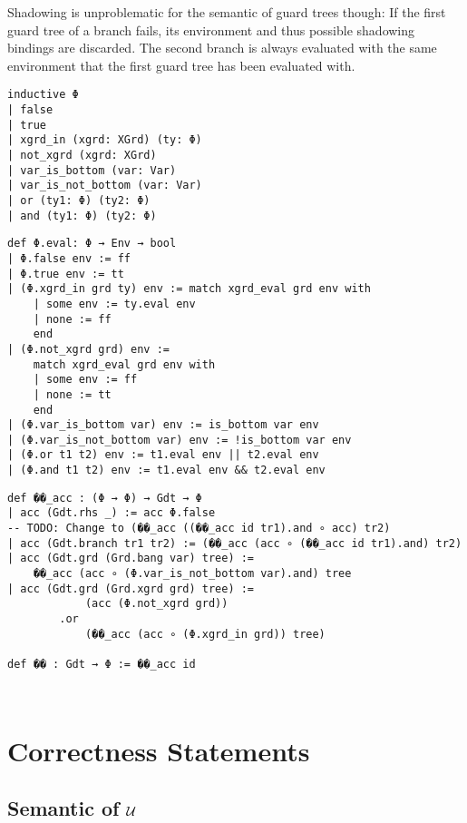 Shadowing is unproblematic for the semantic of guard trees though: If the first guard tree of a branch fails, its environment and thus possible shadowing bindings are discarded.
The second branch is always evaluated with the same environment that the first guard tree has been evaluated with.

\begin{verbatim}
inductive Φ
| false
| true
| xgrd_in (xgrd: XGrd) (ty: Φ)
| not_xgrd (xgrd: XGrd)
| var_is_bottom (var: Var)
| var_is_not_bottom (var: Var)
| or (ty1: Φ) (ty2: Φ)
| and (ty1: Φ) (ty2: Φ)
\end{verbatim}

\begin{verbatim}
def Φ.eval: Φ → Env → bool
| Φ.false env := ff
| Φ.true env := tt
| (Φ.xgrd_in grd ty) env := match xgrd_eval grd env with
    | some env := ty.eval env
    | none := ff
    end
| (Φ.not_xgrd grd) env :=
    match xgrd_eval grd env with
    | some env := ff
    | none := tt
    end
| (Φ.var_is_bottom var) env := is_bottom var env
| (Φ.var_is_not_bottom var) env := !is_bottom var env
| (Φ.or t1 t2) env := t1.eval env || t2.eval env
| (Φ.and t1 t2) env := t1.eval env && t2.eval env
\end{verbatim}

\begin{verbatim}
def ��_acc : (Φ → Φ) → Gdt → Φ
| acc (Gdt.rhs _) := acc Φ.false
-- TODO: Change to (��_acc ((��_acc id tr1).and ∘ acc) tr2)
| acc (Gdt.branch tr1 tr2) := (��_acc (acc ∘ (��_acc id tr1).and) tr2)
| acc (Gdt.grd (Grd.bang var) tree) :=
    ��_acc (acc ∘ (Φ.var_is_not_bottom var).and) tree
| acc (Gdt.grd (Grd.xgrd grd) tree) :=
            (acc (Φ.not_xgrd grd))
        .or
            (��_acc (acc ∘ (Φ.xgrd_in grd)) tree)

def �� : Gdt → Φ := ��_acc id
\end{verbatim}

\begin{verbatim}

\end{verbatim}

\begin{verbatim}

\end{verbatim}

\section{Correctness Statements}

\subsection{Semantic of $\mathcal{U}$}

